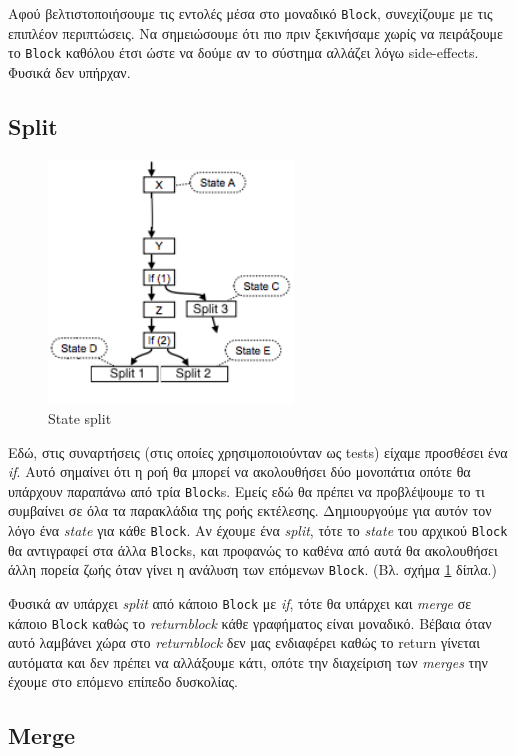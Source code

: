 Αφού βελτιστοποιήσουμε τις εντολές μέσα στο μοναδικό \texttt{Block}, συνεχίζουμε
με τις επιπλέον περιπτώσεις. Να σημειώσουμε ότι πιο πριν ξεκινήσαμε χωρίς να
πειράξουμε το \texttt{Block} καθόλου έτσι ώστε να δούμε αν το σύστημα αλλάζει
λόγω side-effects. Φυσικά δεν υπήρχαν.

\subsection{Split}

\begin{figure}
\caption{State split}\label{wrapped-figure}
\includegraphics[width=6.5cm]{split-state.png}
\end{figure} 

Εδώ, στις συναρτήσεις (στις οποίες χρησιμοποιούνταν ως tests) είχαμε προσθέσει ένα
\textit{if}. Αυτό σημαίνει ότι η ροή θα μπορεί να ακολουθήσει δύο μονοπάτια
οπότε θα υπάρχουν παραπάνω από τρία \texttt{Block}s. Εμείς εδώ θα πρέπει να
προβλέψουμε το τι συμβαίνει σε όλα τα παρακλάδια της ροής εκτέλεσης.
Δημιουργούμε για αυτόν τον λόγο ένα \textit{state} για κάθε \texttt{Block}. Αν
έχουμε ένα \textit{split}, τότε το \textit{state} του αρχικού \texttt{Block} θα
αντιγραφεί στα άλλα \texttt{Block}s, και προφανώς το καθένα από αυτά θα
ακολουθήσει άλλη πορεία ζωής όταν γίνει η ανάλυση των επόμενων \texttt{Block}.
(Βλ. σχήμα \ref{wrapped-figure} δίπλα.)

Φυσικά αν υπάρχει \textit{split} από κάποιο \texttt{Block} με \textit{if}, τότε
θα υπάρχει και \textit{merge} σε κάποιο \texttt{Block} καθώς το
\textit{returnblock} κάθε γραφήματος είναι μοναδικό. Βέβαια όταν αυτό λαμβάνει
χώρα στο \textit{returnblock} δεν μας ενδιαφέρει καθώς το return γίνεται
αυτόματα και δεν πρέπει να αλλάξουμε κάτι, οπότε την διαχείριση των
\textit{merges} την έχουμε στο επόμενο επίπεδο δυσκολίας.

\subsection{Merge}

